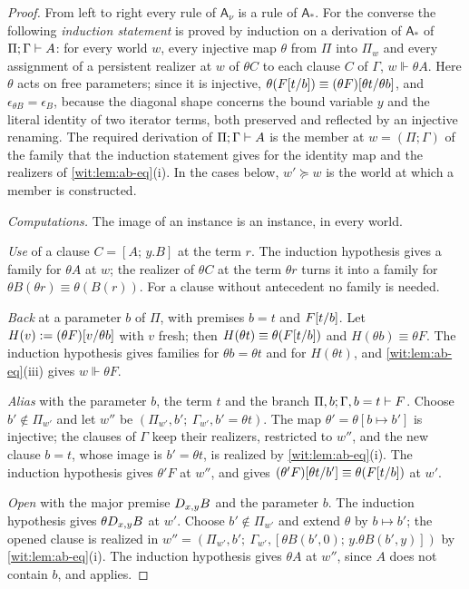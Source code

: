 \begin{proof}
From left to right every rule of $\mathsf{A}_{\nu}$ is a rule of
$\mathsf{A}_{\ast}$.  For the converse the following \emph{induction
statement} is proved by induction on a derivation of $\mathsf{A}_{\ast}$ of
$\Pi;\Gamma\vdash A$: for every world $w$, every injective map $\theta$
from $\Pi$ into $\Pi_w$ and every assignment of a persistent realizer at
$w$ of $\theta C$ to each clause $C$ of $\Gamma$, $w\Vdash\theta A$.
Here $\theta$ acts on free parameters; since it is injective,
$\theta(F[t/b])\equiv(\theta F)[\theta t/\theta b]$, and
$\epsilon_{\theta B}=\epsilon_B$, because the diagonal shape concerns the
bound variable $y$ and the literal identity of two iterator terms, both
preserved and reflected by an injective renaming.  The required derivation
of $\Pi;\Gamma\vdash A$ is the member at $w=(\Pi;\Gamma)$ of the family
that the induction statement gives for the identity map and the realizers of
\cref{wit:lem:ab-eq}(i).  In the cases below, $w'\succeq w$ is the world at
which a member is constructed.

\emph{Computations.}  The image of an instance is an instance, in every
world.

\emph{Use} of a clause $C=[A;\,y.B]$ at the term $r$.  The induction
hypothesis gives a family for $\theta A$ at $w$; the realizer of $\theta C$
at the term $\theta r$ turns it into a family for
$\theta B(\theta r)\equiv\theta(B(r))$.  For a clause without antecedent no
family is needed.

\emph{Back} at a parameter $b$ of $\Pi$, with premises $b=t$ and
$F[t/b]$.  Let $H(v)\mathrel{:=}(\theta F)[v/\theta b]$ with $v$
fresh; then $H(\theta t)\equiv\theta(F[t/b])$ and
$H(\theta b)\equiv\theta F$.  The induction hypothesis gives families for
$\theta b=\theta t$ and for $H(\theta t)$, and \cref{wit:lem:ab-eq}(iii)
gives $w\Vdash\theta F$.

\emph{Alias} with the parameter $b$, the term $t$ and the branch
$\Pi,b;\Gamma,b=t\vdash F$.  Choose $b'\notin\Pi_{w'}$ and let $w''$ be
$(\Pi_{w'},b';\ \Gamma_{w'},b'=\theta t)$.  The map
$\theta'=\theta[b\mapsto b']$ is injective; the clauses of $\Gamma$ keep
their realizers, restricted to $w''$, and the new clause $b=t$, whose
image is $b'=\theta t$, is realized by \cref{wit:lem:ab-eq}(i).  The
induction hypothesis gives $\theta'F$ at $w''$, and  gives
$(\theta'F)[\theta t/b']\equiv\theta(F[t/b])$ at $w'$.

\emph{Open} with the major premise $D_{x,y}B$ and the parameter $b$.  The
induction hypothesis gives $\theta D_{x,y}B$ at $w'$.  Choose
$b'\notin\Pi_{w'}$ and extend $\theta$ by $b\mapsto b'$; the opened clause
is realized in
$w''=(\Pi_{w'},b';\ \Gamma_{w'},[\theta B(b',0);\,y.\theta B(b',y)])$ by
\cref{wit:lem:ab-eq}(i).  The induction hypothesis gives $\theta A$ at
$w''$, since $A$ does not contain $b$, and  applies.


\end{proof}
